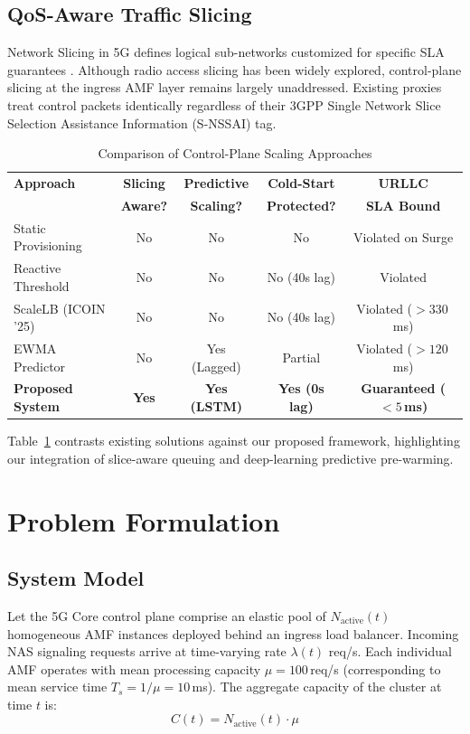 \documentclass[conference]{IEEEtran}
\begin{document}
\subsection{QoS-Aware Traffic Slicing}
Network Slicing in 5G defines logical sub-networks customized for specific SLA guarantees \cite{3gpp23501}. Although radio access slicing has been widely explored, control-plane slicing at the ingress AMF layer remains largely unaddressed. Existing proxies treat control packets identically regardless of their 3GPP Single Network Slice Selection Assistance Information (S-NSSAI) tag.

\begin{table}[htbp]
\caption{Comparison of Control-Plane Scaling Approaches}
\label{tab:lit_comparison}
\centering
\begin{tabular}{lcccc}
\toprule
\textbf{Approach} & \textbf{Slicing} & \textbf{Predictive} & \textbf{Cold-Start} & \textbf{URLLC} \\
 & \textbf{Aware?} & \textbf{Scaling?} & \textbf{Protected?} & \textbf{SLA Bound} \\
\midrule
Static Provisioning & No & No & No & Violated on Surge \\
Reactive Threshold & No & No & No (40s lag) & Violated \\
ScaleLB (ICOIN '25) & No & No & No (40s lag) & Violated ($>330$\,ms) \\
EWMA Predictor & No & Yes (Lagged) & Partial & Violated ($>120$\,ms) \\
\textbf{Proposed System} & \textbf{Yes} & \textbf{Yes (LSTM)} & \textbf{Yes (0s lag)} & \textbf{Guaranteed ($<5$\,ms)} \\
\bottomrule
\end{tabular}
\end{table}

Table~\ref{tab:lit_comparison} contrasts existing solutions against our proposed framework, highlighting our integration of slice-aware queuing and deep-learning predictive pre-warming.

\section{Problem Formulation}

\subsection{System Model}
Let the 5G Core control plane comprise an elastic pool of $N_{\text{active}}(t)$ homogeneous AMF instances deployed behind an ingress load balancer. Incoming NAS signaling requests arrive at time-varying rate $\lambda(t)$ req/s. Each individual AMF operates with mean processing capacity $\mu = 100$\,req/s (corresponding to mean service time $T_s = 1/\mu = 10$\,ms). The aggregate capacity of the cluster at time $t$ is:
\begin{equation}
C(t) = N_{\text{active}}(t) \cdot \mu
\end{equation}
\end{document}
